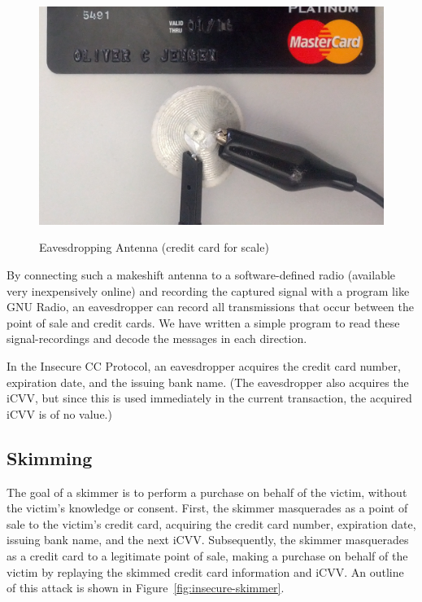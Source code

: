 \begin{figure}
  \caption{Eavesdropping Antenna (credit card for scale)}
  \centering
    \includegraphics[width=1.0\textwidth, clip=true, trim=0 0 0 0]{img/attack-3-eavesdrop-photo.png}
  \label{fig:insecure-eavesdropper-antenna}
\end{figure}

By connecting such a makeshift antenna to a software-defined radio (available very inexpensively online) and recording the captured signal with a program like GNU Radio,
    an eavesdropper can record all transmissions that occur between the point of sale and credit cards.
We have written a simple program to read these signal-recordings and decode the messages in each direction.

In the Insecure CC Protocol, an eavesdropper acquires the credit card number, expiration date, and the issuing bank name.
(The eavesdropper also acquires the iCVV, but since this is used immediately in the current transaction, the acquired iCVV is of no value.)





\subsection{Skimming}
\label{sec:insecure-skimmer}
The goal of a skimmer is to perform a purchase on behalf of the victim, without the victim's knowledge or consent.
First, the skimmer masquerades as a point of sale to the victim's credit card, acquiring the credit card number, expiration date, issuing bank name, and the next iCVV.
Subsequently, the skimmer masquerades as a credit card to a legitimate point of sale, making a purchase on behalf of the victim by replaying the skimmed credit card information and iCVV.
An outline of this attack is shown in Figure~\ref{fig:insecure-skimmer}.

